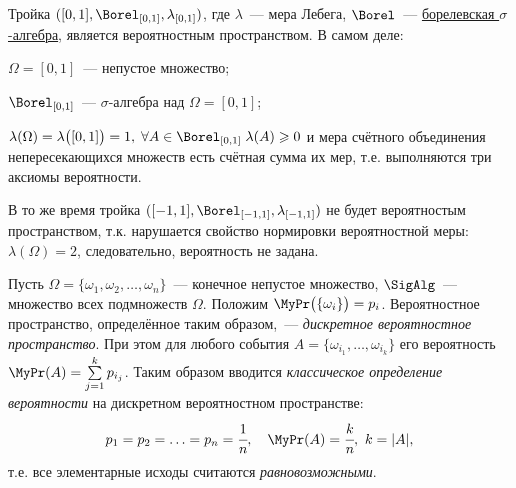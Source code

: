 \begin{exmp}
	Тройка $([0, 1], \Borel_{[0, 1]}, \lambda_{[0, 1]})$, где $\lambda$~--- мера Лебега, $\Borel$~--- \hyperlink{borel}{борелевская $\sigma$-алгебра}, является вероятностным пространством. 
	В самом деле:
	\begin{compactlist}
		\item $\Omega = [0, 1]$~--- непустое множество;
		\item $\Borel_{[0, 1]}$~--- $\sigma$-алгебра над $\Omega = [0, 1]$;
		\item $\lambda(\Omega) = \lambda\bigl( {[0, 1]} \bigr) = 1, \; \forall A \in \Borel_{[0, 1]} \; \lambda(A) \geqslant 0$ и мера счётного объединения непересекающихся множеств есть счётная сумма их мер, т.е. выполняются три аксиомы вероятности.
	\end{compactlist}
	В то же время тройка $([-1, 1], \Borel_{[-1, 1]}, \lambda_{[-1, 1]})$ не будет вероятностым пространством, т.к. нарушается свойство нормировки вероятностной меры: $\lambda(\Omega) = 2$, следовательно, вероятность не задана.
\end{exmp}

\begin{defn}
	Пусть $\Omega = \{\omega_1, \omega_2, \ldots, \omega_n\}$~--- конечное непустое множество, $\SigAlg$~--- множество всех подмножеств $\Omega$. 
	Положим $\MyPr \bigl(\{\omega_i\}\bigr) = p_i$. 
	Вероятностное пространство, определённое таким образом,~--- \textit{дискретное вероятностное пространство}. 
	При этом для любого события $A = \{\omega_{i_1}, \ldots, \omega_{i_k}\}$ его вероятность $\MyPr(A) = \sum\limits_{j=1}^k p_{i_j}$. 
	Таким образом вводится \textit{классическое определение вероятности} на дискретном вероятностном пространстве:
	\begin{equation*}
		p_1 = p_2 = \ldots =p_n=\cfrac{1}{n}, \quad \MyPr(A) = \cfrac{k}{n},~ k=|A|,
	\end{equation*}
	т.е. все элементарные исходы считаются \textit{равновозможными}.
\end{defn}
